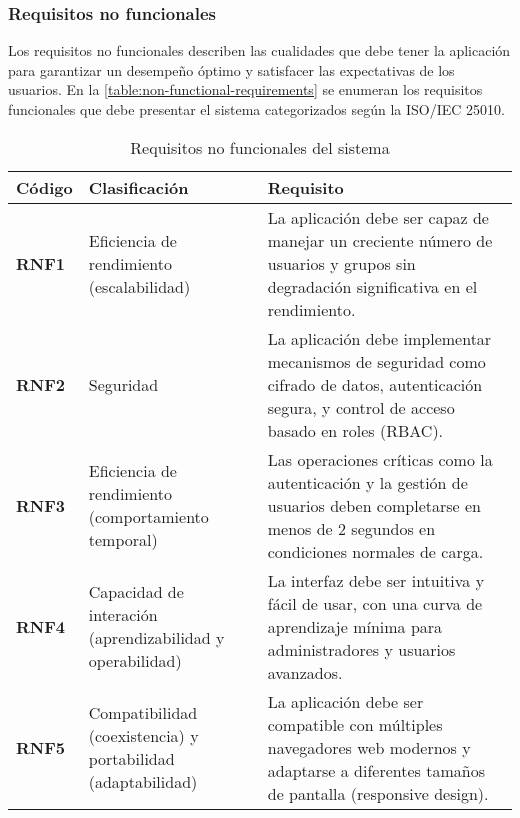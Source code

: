 \subsubsection{Requisitos no funcionales}

Los requisitos no funcionales describen las cualidades que debe tener la aplicación para garantizar un desempeño óptimo y satisfacer las expectativas de los usuarios. En la \autoref{table:non-functional-requirements} se enumeran los requisitos funcionales que debe presentar el sistema categorizados según la ISO/IEC 25010.


\begin{longtable}{|l|p{4cm}|p{10cm}|}
    \caption{Requisitos no funcionales del sistema}
    \label{table:non-functional-requirements}                                                                                                                                                                                            \\
    \hline
    \textbf{Código} & \textbf{Clasificación}                                        & \textbf{Requisito}                                                                                                                                 \\
    \hline
    \endfirsthead
    \textbf{RNF1}   & Eficiencia de rendimiento (escalabilidad)                     & La aplicación debe ser capaz de manejar un creciente número de usuarios y grupos sin degradación significativa en el rendimiento.                  \\ \hline
    \textbf{RNF2}   & Seguridad                                                     & La aplicación debe implementar mecanismos de seguridad como cifrado de datos, autenticación segura, y control de acceso basado en roles (RBAC).    \\ \hline
    \textbf{RNF3}   & Eficiencia de rendimiento (comportamiento temporal)           & Las operaciones críticas como la autenticación y la gestión de usuarios deben completarse en menos de 2 segundos en condiciones normales de carga. \\ \hline
    \textbf{RNF4}   & Capacidad de interación (aprendizabilidad y operabilidad)     & La interfaz debe ser intuitiva y fácil de usar, con una curva de aprendizaje mínima para administradores y usuarios avanzados.                     \\ \hline
    \textbf{RNF5}   & Compatibilidad (coexistencia) y portabilidad (adaptabilidad)  & La aplicación debe ser compatible con múltiples navegadores web modernos y adaptarse a diferentes tamaños de pantalla (responsive design).         \\ \hline

\end{longtable}
